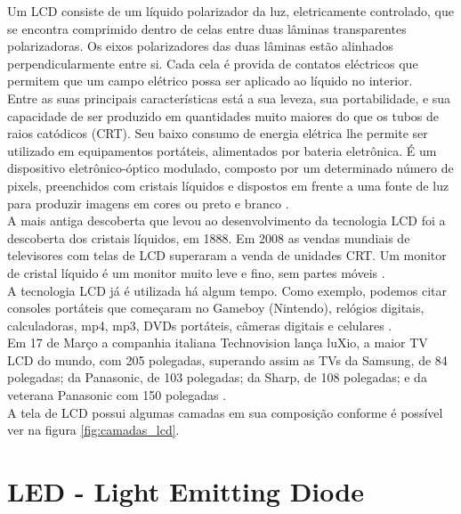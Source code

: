 Um LCD consiste de um líquido polarizador da luz, eletricamente controlado, que se encontra comprimido dentro de celas entre duas lâminas transparentes polarizadoras. Os eixos polarizadores das duas lâminas estão alinhados perpendicularmente entre si. Cada cela é provida de contatos eléctricos que permitem que um campo elétrico possa ser aplicado ao líquido no interior.\\

Entre as suas principais características está a sua leveza, sua portabilidade, e sua capacidade de ser produzido em quantidades muito maiores do que os tubos de raios catódicos (CRT). Seu baixo consumo de energia elétrica lhe permite ser utilizado em equipamentos portáteis, alimentados por bateria eletrônica. É um dispositivo eletrônico-óptico modulado, composto por um determinado número de pixels, preenchidos com cristais líquidos e dispostos em frente a uma fonte de luz para produzir imagens em cores ou preto e branco \cite{WikipediaLCD}.\\

A mais antiga descoberta que levou ao desenvolvimento da tecnologia LCD foi a descoberta dos cristais líquidos, em 1888. Em 2008 as vendas mundiais de televisores com telas de LCD superaram a venda de unidades CRT. Um monitor de cristal líquido é um monitor muito leve e fino, sem partes móveis \cite{WikipediaLCD}.\\

A tecnologia LCD já é utilizada há algum tempo. Como exemplo, podemos citar consoles portáteis que começaram no Gameboy (Nintendo), relógios digitais, calculadoras, mp4, mp3, DVDs portáteis, câmeras digitais e celulares \cite{WikipediaLCD}.\\

Em 17 de Março a companhia italiana Technovision lança luXio, a maior TV LCD do mundo, com 205 polegadas, superando assim as TVs da Samsung, de 84 polegadas; da Panasonic, de 103 polegadas; da Sharp, de 108 polegadas; e da veterana Panasonic com 150 polegadas \cite{WikipediaLCD}. \\

A tela de LCD possui algumas camadas em sua composição conforme é possível ver na figura \ref{fig:camadas_lcd}.\\


\section{LED - Light Emitting Diode}
\label{sec:led}

